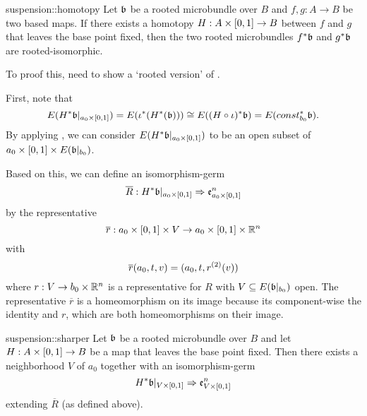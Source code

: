 \begin{mytheorem}{suspension::homotopy}
    Let $\mathfrak{b}$ be a rooted microbundle over $B$ and $f, g: A \to B$ be two based maps.
    If there exists a homotopy $H: A \times{} [0, 1] \to B$ between $f$ and $g$ that leaves the base point fixed,
    then the two rooted microbundles $f^*\mathfrak{b}$ and $g^*\mathfrak{b}$ are rooted-isomorphic.
\end{mytheorem}

\begin{myparagraph}
    To proof this, need to show a `rooted version' of .
    
    First, note that 
    \[
        E(H^*\mathfrak{b}\vert_{a_0 \times{} [0, 1]}) = E(\iota^*(H^*(\mathfrak{b})))
        \cong E((H \circ \iota)^*\mathfrak{b}) = E(const_{b_0}^*\mathfrak{b}).
    \]
    By applying , we can consider $E(H^*\mathfrak{b}\vert_{a_0 \times{} [0, 1]})$
    to be an open subset of $a_0 \times [0, 1] \times E(\mathfrak{b}\vert_{b_0})$.

    Based on this, we can define an isomorphism-germ
    \[ \overline{R}: H^*\mathfrak{b}\vert_{a_0 \times{} [0, 1]} \Rightarrow{} \mathfrak{e}^{n}_{a_0 \times{} [0, 1]} \]
    by the representative
    \[ \overline{r}: a_0 \times{} [0, 1] \times V \to a_0 \times{} [0, 1] \times \mathbb{R}^n \]
    with
    \[ \overline{r}(a_0, t, v) = (a_0, t, r^{(2)}(v) )\]
    where $r: V \to b_0 \times \mathbb{R}^n$ is a representative for $R$ with $V \subseteq{} E(\mathfrak{b}\vert_{b_0})$ open.
    The representative $\overline{r}$ is a homeomorphism on its image
    because its component-wise the identity and $r$, which are both homeomorphisms on their image. 
\end{myparagraph}

\begin{mylemma}{suspension::sharper}
    Let $\mathfrak{b}$ be a rooted microbundle over $B$ and
    let $H: A \times{} [0, 1] \to B$ be a map that leaves the base point fixed.
    Then there exists a neighborhood $V$ of $a_0$ together with an isomorphism-germ
    \[ H^*\mathfrak{b}\vert_{V \times{} [0, 1]} \Rightarrow{} \mathfrak{e}^{n}_{V \times{} [0, 1]} \]
    extending $\overline{R}$ (as defined above).
\end{mylemma}

